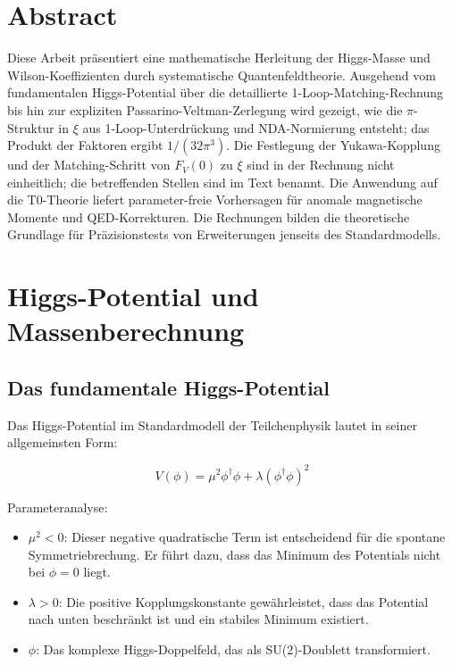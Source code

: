 \section*{Abstract}
		Diese Arbeit präsentiert eine mathematische Herleitung der Higgs-Masse und Wilson-Koeffizienten durch systematische Quantenfeldtheorie. Ausgehend vom fundamentalen Higgs-Potential über die detaillierte 1-Loop-Matching-Rechnung bis hin zur expliziten Passarino-Veltman-Zerlegung wird gezeigt, wie die $\pi$-Struktur in $\xi$ aus 1-Loop-Unterdrückung und NDA-Normierung entsteht; das Produkt der Faktoren ergibt $1/(32\pi^3)$. Die Festlegung der Yukawa-Kopplung und der Matching-Schritt von $F_V(0)$ zu $\xi$ sind in der Rechnung nicht einheitlich; die betreffenden Stellen sind im Text benannt. Die Anwendung auf die T0-Theorie liefert parameter-freie Vorhersagen für anomale magnetische Momente und QED-Korrekturen. Die Rechnungen bilden die theoretische Grundlage für Präzisionstests von Erweiterungen jenseits des Standardmodells.

	
	
	\section{Higgs-Potential und Massenberechnung}
	
	\subsection{Das fundamentale Higgs-Potential}
	
	Das Higgs-Potential im Standardmodell der Teilchenphysik lautet in seiner allgemeinsten Form:
	
	\begin{equation}
		V(\phi) = \mu^2 \phi^\dagger\phi + \lambda(\phi^\dagger\phi)^2
	\end{equation}
	
	\begin{wichtig}
		Parameteranalyse:
		\begin{itemize}
			\item $\mu^2 < 0$: Dieser negative quadratische Term ist entscheidend für die spontane Symmetriebrechung. Er führt dazu, dass das Minimum des Potentials nicht bei $\phi = 0$ liegt.
			\item $\lambda > 0$: Die positive Kopplungskonstante gewährleistet, dass das Potential nach unten beschränkt ist und ein stabiles Minimum existiert.
			\item $\phi$: Das komplexe Higgs-Doppelfeld, das als SU(2)-Doublett transformiert.
		\end{itemize}
	\end{wichtig}
	
